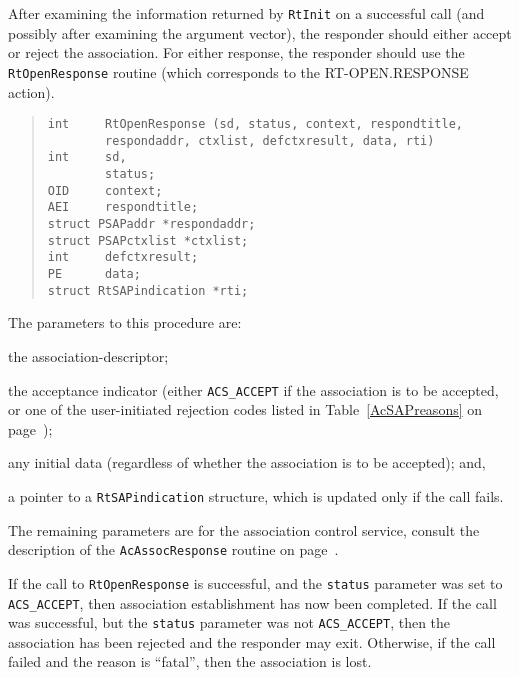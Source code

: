 After examining the information returned by \verb"RtInit" on a successful call
(and possibly after examining the argument vector),
the responder should either accept or reject the association.
For either response,
the responder should use
the \verb"RtOpenResponse" routine
(which corresponds to the {\sf RT-OPEN.RESPONSE\/} action).
\begin{quote}\small\begin{verbatim}
int     RtOpenResponse (sd, status, context, respondtitle, 
        respondaddr, ctxlist, defctxresult, data, rti)
int     sd,
        status;
OID     context;
AEI     respondtitle;
struct PSAPaddr *respondaddr;
struct PSAPctxlist *ctxlist;
int     defctxresult;
PE      data;
struct RtSAPindication *rti;
\end{verbatim}\end{quote}
The parameters to this procedure are:
\begin{describe}
\item[\verb"sd":] the association-descriptor;

\item[\verb"status":] the acceptance indicator
(either \verb"ACS_ACCEPT" if the association is to be accepted,
or one of the user-initiated rejection codes listed in
Table~\ref{AcSAPreasons} on page~\pageref{AcSAPreasons});

\item[\verb"data":] any initial data
(regardless of whether the association is to be accepted);
and,

\item[\verb"rti":] a pointer to a \verb"RtSAPindication" structure,
which is updated only if the call fails.
\end{describe}
The remaining parameters are for the association control service,
consult the description of the \verb"AcAssocResponse" routine on
page~\pageref{AcAssocResponse}.

If the call to \verb"RtOpenResponse" is successful,
and the \verb"status" parameter was set to \verb"ACS_ACCEPT",
then association establishment has now been completed.
If the call was successful,
but the \verb"status" parameter was not \verb"ACS_ACCEPT",
then the association has been rejected and the responder may exit.
Otherwise,
if the call failed and the reason is ``fatal'',
then the association is lost.

